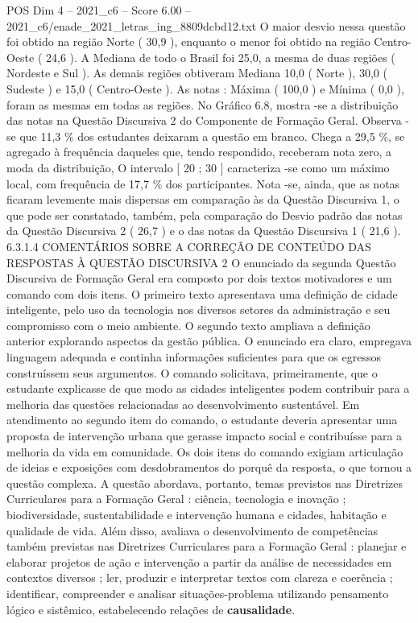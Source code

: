 \begin{textsample}{POS Dim 4 – 2021\_c6 – Score 6.00 – 2021\_c6/enade\_2021\_letras\_ing\_8809dcbd12.txt}
O maior desvio nessa questão foi obtido na região Norte ( 30,9 ), enquanto o menor foi obtido na região Centro-Oeste ( 24,6 ).
A Mediana de todo o Brasil foi 25,0, a mesma de duas regiões ( Nordeste e Sul ).
As demais regiões obtiveram Mediana 10,0 ( Norte ), 30,0 ( Sudeste ) e 15,0 ( Centro-Oeste ).
As notas : Máxima ( 100,0 ) e Mínima ( 0,0 ), foram as mesmas em todas as regiões.
No Gráfico 6.8, mostra -se a distribuição das notas na Questão Discursiva 2 do Componente de Formação Geral.
Observa -se que 11,3 \% dos estudantes deixaram a questão em branco.
Chega a 29,5 \%, se agregado à frequência daqueles que, tendo respondido, receberam nota zero, a moda da distribuição, O intervalo [ 20 ; 30 ] caracteriza -se como um máximo local, com frequência de 17,7 \% dos participantes.
Nota -se, ainda, que as notas ficaram levemente mais dispersas em comparação às da Questão Discursiva 1, o que pode ser constatado, também, pela comparação do Desvio padrão das notas da Questão Discursiva 2 ( 26,7 ) e o das notas da Questão Discursiva 1 ( 21,6 ). 6.3.1.4 COMENTÁRIOS SOBRE A CORREÇÃO DE CONTEÚDO DAS RESPOSTAS À QUESTÃO DISCURSIVA 2 O enunciado da segunda Questão Discursiva de Formação Geral era composto por dois textos motivadores e um comando com dois itens.
O primeiro texto apresentava uma definição de cidade inteligente, pelo uso da tecnologia nos diversos setores da administração e seu compromisso com o meio ambiente.
O segundo texto ampliava a definição anterior explorando aspectos da gestão pública.
O enunciado era claro, empregava linguagem adequada e continha informações suficientes para que os egressos construíssem seus argumentos.
O comando solicitava, primeiramente, que o estudante explicasse de que modo as cidades inteligentes podem contribuir para a melhoria das questões relacionadas ao desenvolvimento sustentável.
Em atendimento ao segundo item do comando, o estudante deveria apresentar uma proposta de intervenção urbana que gerasse impacto social e contribuísse para a melhoria da vida em comunidade.
Os dois itens do comando exigiam articulação de ideias e exposições com desdobramentos do porquê da resposta, o que tornou a questão complexa.
A questão abordava, portanto, temas previstos nas Diretrizes Curriculares para a Formação Geral : ciência, tecnologia e inovação ; biodiversidade, sustentabilidade e intervenção humana e cidades, habitação e qualidade de vida.
Além disso, avaliava o desenvolvimento de competências também previstas nas Diretrizes Curriculares para a Formação Geral : planejar e elaborar projetos de ação e intervenção a partir da análise de necessidades em contextos diversos ; ler, produzir e interpretar textos com clareza e coerência ; identificar, compreender e analisar situações-problema utilizando pensamento lógico e sistêmico, estabelecendo relações de \textbf{causalidade}.

\end{textsample}

